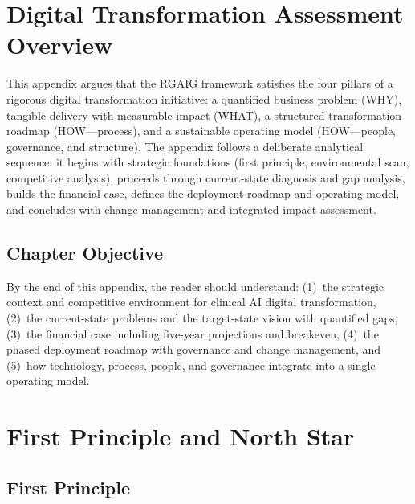
\section{Digital Transformation Assessment Overview}
\label{app:dt_overview}

This appendix argues that the RGAIG framework satisfies the four pillars of a rigorous digital transformation initiative: a quantified business problem (WHY), tangible delivery with measurable impact (WHAT), a structured transformation roadmap (HOW---process), and a sustainable operating model (HOW---people, governance, and structure). The appendix follows a deliberate analytical sequence: it begins with strategic foundations (first principle, environmental scan, competitive analysis), proceeds through current-state diagnosis and gap analysis, builds the financial case, defines the deployment roadmap and operating model, and concludes with change management and integrated impact assessment.

\subsection{Chapter Objective}

By the end of this appendix, the reader should understand: (1)~the strategic context and competitive environment for clinical AI digital transformation, (2)~the current-state problems and the target-state vision with quantified gaps, (3)~the financial case including five-year projections and breakeven, (4)~the phased deployment roadmap with governance and change management, and (5)~how technology, process, people, and governance integrate into a single operating model.


\section{First Principle and North Star}
\label{sec:dt_first_principle}

\subsection{First Principle}


